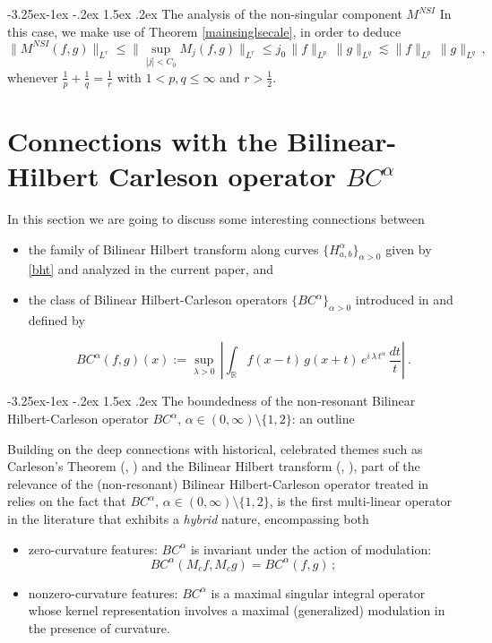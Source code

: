 \documentclass[a4paper,reqno]{amsart}
\makeatletter
\def\subsection{\@startsection{subsection}{2}{\z@}%
	{-3.25ex\@plus -1ex \@minus -.2ex}%
	{1.5ex \@plus .2ex}%
	{\normalfont\bfseries\boldmath}}
\numberwithin{equation}{section}
\theoremstyle{definition}
\newcommand{\R}{\mathbb{R}}
\def\a{\alpha}
\def\l{\lambda}
\makeatother
\begin{document}
\subsection{The analysis of the non-singular component $M^{NSI}$}
In this case, we make use of Theorem \ref{mainsinglsecale}, in order to deduce
\begin{equation*}
	\|M^{NSI}(f,g)\|_{L^r}\leq \Big\|\sup_{|j|<C_0} M_j(f,g)\Big\|_{L^r}\leq j_0\, \|f\|_{L^p}\,\|g\|_{L^q}\lesssim \|f\|_{L^p}\,\|g\|_{L^q}\,,
\end{equation*}
whenever $\frac1p+\frac1q=\frac1r$ with $1<p,q\leq \infty$ and $r>\frac12$.

\section{Connections with the Bilinear-Hilbert Carleson operator $BC^{\a}$}\label{BHCalfa}


In this section we are going to discuss some interesting connections between
\begin{itemize}
\item the family of Bilinear Hilbert transform along curves $\{H_{a,b}^{\a}\}_{\a>0}$ given by \eqref{bht} and analyzed in the current paper, and

\item the class of Bilinear Hilbert-Carleson operators $\{BC^{\a}\}_{\a>0}$ introduced in \cite{BBLV21}  and defined by

\begin{equation}\label{bhc}
	BC^{\a}(f,g)(x):= \sup_{\l>0}\,\left|\int_{\R} f(x-t)\, g(x+t)\,e^{i\,\l\,t^{\a}}\,\frac{dt}{t}\right|\:.
\end{equation}

\end{itemize}

\subsection{The boundedness of the non-resonant Bilinear Hilbert-Carleson operator $BC^{\a}$, $\a\in (0,\infty)\setminus\{1,2\}$: an outline}

Building on the deep connections with historical, celebrated themes such as Carleson's Theorem (\cite{Car66}, \cite{Feff73}) and the Bilinear Hilbert transform (\cite{LT97}, \cite{LT99}), part of the relevance of the (non-resonant) Bilinear Hilbert-Carleson operator treated in \cite{BBLV21} relies on the fact that $BC^{\a}$, $\a\in (0,\infty)\setminus\{1,2\}$, is the first multi-linear operator in the literature that exhibits a \emph{hybrid} nature, encompassing both
\begin{itemize}
\item zero-curvature features: $BC^{\a}$ is invariant under the action of modulation:
$$BC^{\a}(M_cf,M_cg)=BC^{\a}(f,g)\,;$$
\item nonzero-curvature features: $BC^{\a}$ is a maximal singular integral operator whose kernel representation involves a maximal (generalized) modulation in the presence of curvature.
\end{itemize}
\end{document}
